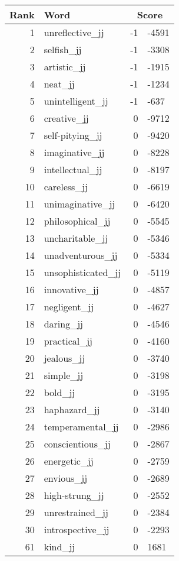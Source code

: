 \begin{longtable}[!htbp]{| rlr@{.}l |}
    \hline
    \textbf{Rank} & \textbf{Word} & \multicolumn{2}{c|}{\textbf{Score}} \\
    \hline
    \endhead
    1 & unreflective\_jj & -1 & -4591 \\
    2 & selfish\_jj & -1 & -3308 \\
    3 & artistic\_jj & -1 & -1915 \\
    4 & neat\_jj & -1 & -1234 \\
    5 & unintelligent\_jj & -1 & -637 \\
    6 & creative\_jj & 0 & -9712 \\
    7 & self-pitying\_jj & 0 & -9420 \\
    8 & imaginative\_jj & 0 & -8228 \\
    9 & intellectual\_jj & 0 & -8197 \\
    10 & careless\_jj & 0 & -6619 \\
    11 & unimaginative\_jj & 0 & -6420 \\
    12 & philosophical\_jj & 0 & -5545 \\
    13 & uncharitable\_jj & 0 & -5346 \\
    14 & unadventurous\_jj & 0 & -5334 \\
    15 & unsophisticated\_jj & 0 & -5119 \\
    16 & innovative\_jj & 0 & -4857 \\
    17 & negligent\_jj & 0 & -4627 \\
    18 & daring\_jj & 0 & -4546 \\
    19 & practical\_jj & 0 & -4160 \\
    20 & jealous\_jj & 0 & -3740 \\
    21 & simple\_jj & 0 & -3198 \\
    22 & bold\_jj & 0 & -3195 \\
    23 & haphazard\_jj & 0 & -3140 \\
    24 & temperamental\_jj & 0 & -2986 \\
    25 & conscientious\_jj & 0 & -2867 \\
    26 & energetic\_jj & 0 & -2759 \\
    27 & envious\_jj & 0 & -2689 \\
    28 & high-strung\_jj & 0 & -2552 \\
    29 & unrestrained\_jj & 0 & -2384 \\
    30 & introspective\_jj & 0 & -2293 \\
    61 & kind\_jj & 0 & 1681 \\

\end{longtable}
